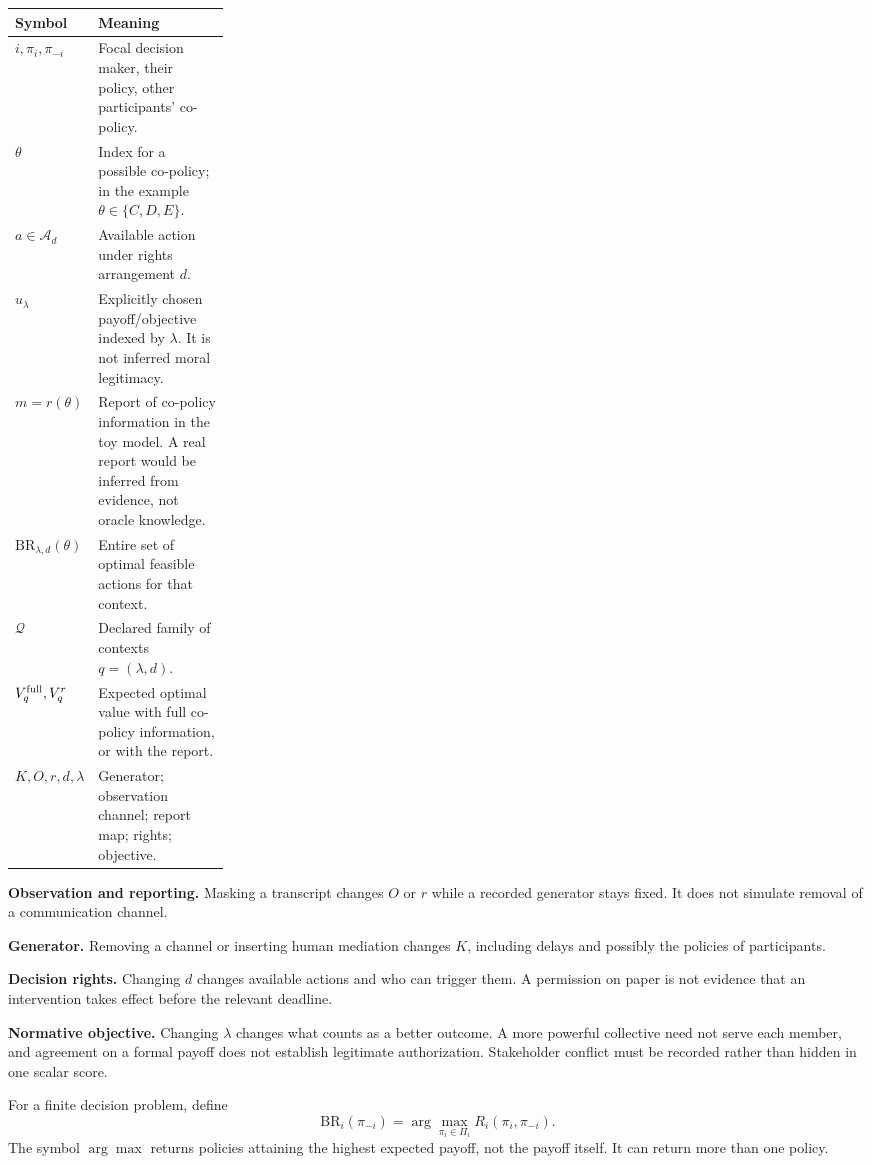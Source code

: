 \documentclass[11pt,letterpaper]{article}
\begin{document}
\begin{tabularx}{\linewidth}{L{0.25\linewidth}Y}\toprule
Symbol & Meaning \\\midrule
$i,\pi_i,\pi_{-i}$ & Focal decision maker, their policy, other participants' co-policy. \\
$\theta$ & Index for a possible co-policy; in the example $\theta\in\{C,D,E\}$. \\
$a\in\mathcal A_d$ & Available action under rights arrangement $d$. \\
$u_\lambda$ & Explicitly chosen payoff/objective indexed by $\lambda$. It is not inferred moral legitimacy. \\
$m=r(\theta)$ & Report of co-policy information in the toy model. A real report would be inferred from evidence, not oracle knowledge. \\
$\mathrm{BR}_{\lambda,d}(\theta)$ & Entire set of optimal feasible actions for that context. \\
$\mathcal Q$ & Declared family of contexts $q=(\lambda,d)$. \\
$V_q^{\rm full},V_q^r$ & Expected optimal value with full co-policy information, or with the report. \\
$K,O,r,d,\lambda$ & Generator; observation channel; report map; rights; objective. \\\bottomrule
\end{tabularx}

\textbf{Observation and reporting.} Masking a transcript changes $O$ or $r$ while a recorded generator stays fixed. It does not simulate removal of a communication channel.

\textbf{Generator.} Removing a channel or inserting human mediation changes $K$, including delays and possibly the policies of participants.

\textbf{Decision rights.} Changing $d$ changes available actions and who can trigger them. A permission on paper is not evidence that an intervention takes effect before the relevant deadline.

\textbf{Normative objective.} Changing $\lambda$ changes what counts as a better outcome. A more powerful collective need not serve each member, and agreement on a formal payoff does not establish legitimate authorization. Stakeholder conflict must be recorded rather than hidden in one scalar score.

For a finite decision problem, define
\begin{equation}
 \mathrm{BR}_i(\pi_{-i})=
 \arg\max_{\pi_i\in\Pi_i}R_i(\pi_i,\pi_{-i}).
\end{equation}
The symbol $\arg\max$ returns policies attaining the highest expected payoff, not the payoff itself. It can return more than one policy.
\end{document}
